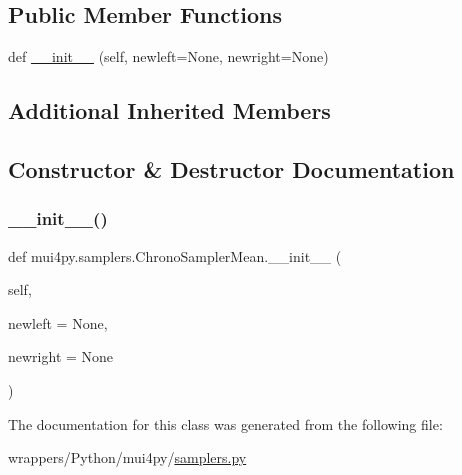 \subsection*{Public Member Functions}
\begin{DoxyCompactItemize}
\item 
def \hyperlink{classmui4py_1_1samplers_1_1_chrono_sampler_mean_a27736267f8e88534472d7966c29091bc}{\+\_\+\+\_\+init\+\_\+\+\_\+} (self, newleft=None, newright=None)
\end{DoxyCompactItemize}
\subsection*{Additional Inherited Members}


\subsection{Constructor \& Destructor Documentation}
\mbox{\label{classmui4py_1_1samplers_1_1_chrono_sampler_mean_a27736267f8e88534472d7966c29091bc}} 
\subsubsection{\texorpdfstring{\+\_\+\+\_\+init\+\_\+\+\_\+()}{\_\_init\_\_()}}
{\footnotesize\ttfamily def mui4py.\+samplers.\+Chrono\+Sampler\+Mean.\+\_\+\+\_\+init\+\_\+\+\_\+ (\begin{DoxyParamCaption}\item[{}]{self,  }\item[{}]{newleft = {\ttfamily None},  }\item[{}]{newright = {\ttfamily None} }\end{DoxyParamCaption})}



The documentation for this class was generated from the following file\+:\begin{DoxyCompactItemize}
\item 
wrappers/\+Python/mui4py/\hyperlink{samplers_8py}{samplers.\+py}\end{DoxyCompactItemize}
